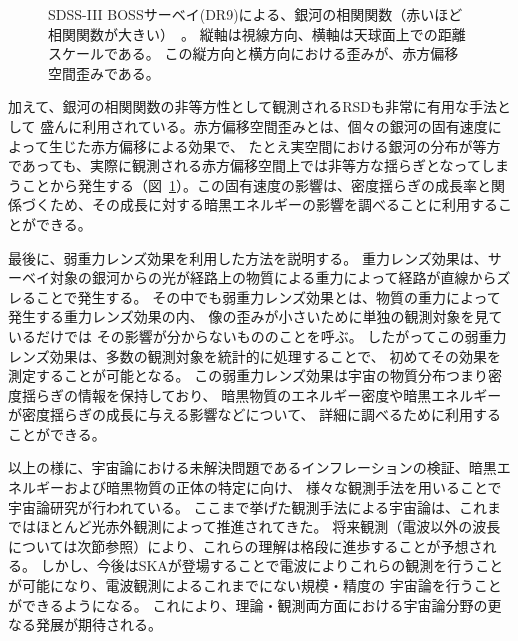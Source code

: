 \begin{figure}[t]
\begin{minipage}{0.5\hsize}
\begin{center}
   \caption{SDSS-III BOSSサーベイ(DR9)による、銀河の相関関数（赤いほど相関関数が大きい）~\citep{Reid:2012sw}。
           縦軸は視線方向、横軸は天球面上での距離スケールである。
           この縦方向と横方向における歪みが、赤方偏移空間歪みである。
           }\label{fig:BOSS_RSD}  
 \end{center}
 \end{minipage}
\end{figure}

加えて、銀河の相関関数の非等方性として観測されるRSDも非常に有用な手法として
盛んに利用されている。赤方偏移空間歪みとは、個々の銀河の固有速度によって生じた赤方偏移による効果で、
たとえ実空間における銀河の分布が等方であっても、実際に観測される赤方偏移空間上では非等方な揺らぎとなってしまうことから発生する（図~\ref{fig:BOSS_RSD}）。この固有速度の影響は、密度揺らぎの成長率と関係づくため、その成長に対する暗黒エネルギーの影響を調べることに利用することができる。

最後に、弱重力レンズ効果を利用した方法を説明する。
重力レンズ効果は、サーベイ対象の銀河からの光が経路上の物質による重力によって経路が直線からズレることで発生する。
その中でも弱重力レンズ効果とは、物質の重力によって発生する重力レンズ効果の内、
像の歪みが小さいために単独の観測対象を見ているだけでは
その影響が分からないもののことを呼ぶ。
したがってこの弱重力レンズ効果は、多数の観測対象を統計的に処理することで、
初めてその効果を測定することが可能となる。
%
この弱重力レンズ効果は宇宙の物質分布つまり密度揺らぎの情報を保持しており、
暗黒物質のエネルギー密度や暗黒エネルギーが密度揺らぎの成長に与える影響などについて、
詳細に調べるために利用することができる。

\vspace{15pt}


以上の様に、宇宙論における未解決問題であるインフレーションの検証、暗黒エネルギーおよび暗黒物質の正体の特定に向け、
様々な観測手法を用いることで宇宙論研究が行われている。
ここまで挙げた観測手法による宇宙論は、これまではほとんど光赤外観測によって推進されてきた。
将来観測（電波以外の波長については次節参照）により、これらの理解は格段に進歩することが予想される。
しかし、今後はSKAが登場することで電波によりこれらの観測を行うことが可能になり、電波観測によるこれまでにない規模・精度の
宇宙論を行うことができるようになる。
これにより、理論・観測両方面における宇宙論分野の更なる発展が期待される。

